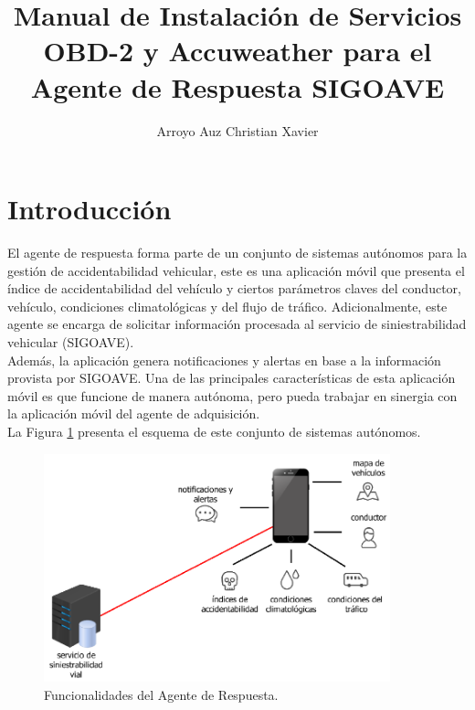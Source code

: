\documentclass[a4paper,10pt, oneside, titlepage]{article}
\title{Manual de Instalación de Servicios OBD-2 y Accuweather para el Agente de Respuesta SIGOAVE}
\author{Arroyo Auz Christian Xavier}
\date{}
\begin{document}
	\maketitle
	\section{Introducción}\label{Etiqueta_Introduccion}
	El agente de respuesta forma parte de un conjunto de sistemas autónomos para la gestión de accidentabilidad vehicular, este es una aplicación móvil que presenta el índice de accidentabilidad del vehículo y ciertos parámetros claves del conductor, vehículo, condiciones climatológicas y del flujo de tráfico. Adicionalmente, este agente se encarga de solicitar información procesada al servicio de siniestrabilidad vehicular (SIGOAVE). \\\newline
	\indent Además, la aplicación genera notificaciones y alertas en base a la información provista por SIGOAVE. Una de las principales características de esta aplicación móvil es que funcione de manera autónoma, pero pueda trabajar en sinergia con la aplicación móvil del agente de adquisición. \\\newline
	\indent La Figura \ref{Funcionalidad} presenta el esquema de este conjunto de sistemas autónomos.
	\begin{figure}[!h]
		\centering
		\includegraphics[width = 1\linewidth, height = 6.6cm]{Funcionalidad.png}
		\caption{Funcionalidades del Agente de Respuesta.}
		\label{Funcionalidad}
	\end{figure}
	
\end{document}
